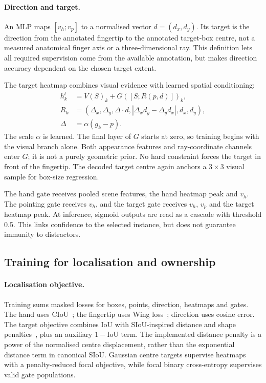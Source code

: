 \paragraph{Direction and target.}
An MLP maps $[v_h;v_p]$ to a normalised vector $d=(d_x,d_y)$. Its target is the direction from the annotated fingertip to the annotated target-box centre, not a measured anatomical finger axis or a three-dimensional ray. This definition lets all required supervision come from the available annotation, but makes direction accuracy dependent on the chosen target extent.

The target heatmap combines visual evidence with learned spatial conditioning:
\begin{align}
 h^t_k &= V(S)_k+G([S;R(p,d)])_k, \label{eq:target}\\
 R_k &= (\Delta_x,\Delta_y,\Delta\cdot d,
              |\Delta_xd_y-\Delta_yd_x|,d_x,d_y), \nonumber\\
 \Delta &= \alpha(g_k-p). \nonumber
\end{align}
The scale $\alpha$ is learned. The final layer of $G$ starts at zero, so training begins with the visual branch alone. Both appearance features and ray-coordinate channels enter $G$; it is not a purely geometric prior. No hard constraint forces the target in front of the fingertip. The decoded target centre again anchors a $3\times3$ visual sample for box-size regression.

The hand gate receives pooled scene features, the hand heatmap peak and $v_h$. The pointing gate receives $v_h$, and the target gate receives $v_h$, $v_p$ and the target heatmap peak. At inference, sigmoid outputs are read as a cascade with threshold 0.5. This links confidence to the selected instance, but does not guarantee immunity to distractors.

\subsection{Training for localisation and ownership}
\paragraph{Localisation objective.}
Training sums masked losses for boxes, points, direction, heatmaps and gates. The hand uses CIoU~\cite{zheng2020distance}; the fingertip uses Wing loss~\cite{feng2018wing}; direction uses cosine error. The target objective combines IoU with SIoU-inspired distance and shape penalties~\cite{gevorgyan2022siou}, plus an auxiliary $1-\mathrm{IoU}$ term. The implemented distance penalty is a power of the normalised centre displacement, rather than the exponential distance term in canonical SIoU. Gaussian centre targets supervise heatmaps with a penalty-reduced focal objective, while focal binary cross-entropy supervises valid gate populations.

